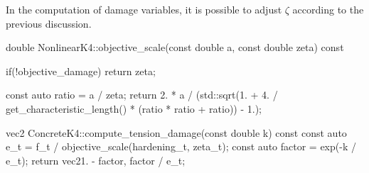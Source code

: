 In the computation of damage variables, it is possible to adjust $\zeta$ according to the previous discussion.
\begin{cppcode}
double NonlinearK4::objective_scale(const double a, const double zeta) const {
    if(!objective_damage) return zeta;

    const auto ratio = a / zeta;
    return 2. * a / (std::sqrt(1. + 4. / get_characteristic_length() * (ratio * ratio + ratio)) - 1.);
}

vec2 ConcreteK4::compute_tension_damage(const double k) const {
    const auto e_t = f_t / objective_scale(hardening_t, zeta_t);
    const auto factor = exp(-k / e_t);
    return vec2{1. - factor, factor / e_t};
}
\end{cppcode}